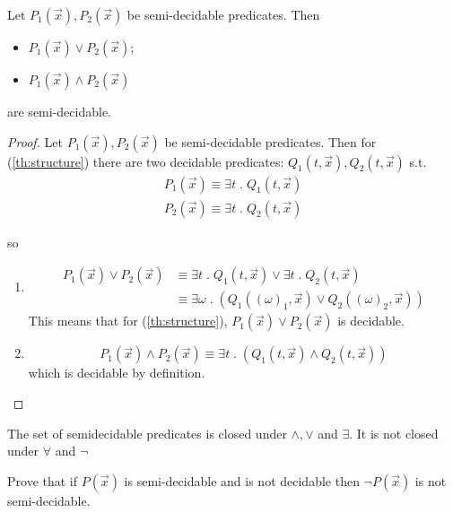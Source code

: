 \begin{theorem}
  Let $ P_1(\vec{x}), P_2(\vec{x}) $ be semi-decidable predicates. Then
  \begin{itemize}
  \item $  P_1(\vec{x}) \lor P_2(\vec{x}) $;
  \item $ P_1(\vec{x}) \land P_2(\vec{x}) $
  \end{itemize}
  are semi-decidable.

  \begin{proof}
    Let $ P_1(\vec{x}), P_2(\vec{x}) $ be semi-decidable
    predicates. Then for (\ref{th:structure}) there are two
    decidable predicates: \( Q_1(t, \vec{x}), Q_2(t, \vec{x})\) s.t.
    \begin{gather*}
      P_1(\vec{x}) \equiv \exists t \; . \; Q_1(t, \vec{x}) \\
      P_2(\vec{x}) \equiv \exists t \; . \; Q_2(t, \vec{x})
    \end{gather*}

    so
    \begin{enumerate}[label=(\arabic*)]
    \item
      \[
        \begin{split}
          P_1(\vec{x}) \lor P_2(\vec{x}) &\equiv \exists t \; . \;
          Q_1(t, \vec{x}) \lor \exists t \; . \; Q_2(t, \vec{x}) \\
          &\equiv \exists \omega \; . \; (Q_1((\omega)_1, \vec{x})
          \lor Q_2((\omega)_2, \vec{x}))
        \end{split}
      \]
      This means that for (\ref{th:structure}),
      $P_1(\vec{x}) \lor P_2(\vec{x})$ is decidable.

    \item
      \[
        P_1(\vec{x}) \land P_2(\vec{x}) \equiv \exists t \; . \;
        (Q_1(t, \vec{x}) \land Q_2(t, \vec{x}))
      \]
      which is decidable by definition.
    \end{enumerate}
  \end{proof}
\end{theorem}

\begin{observation}
  The set of semidecidable predicates is closed under $\land, \lor$
  and $\exists$. It is not closed under $\forall$ and $\lnot$
\end{observation}

\begin{exercize}
  Prove that if $ P(\vec{x}) $ is semi-decidable and is not decidable
  then $ \lnot P(\vec{x}) $ is not semi-decidable.
\end{exercize}

